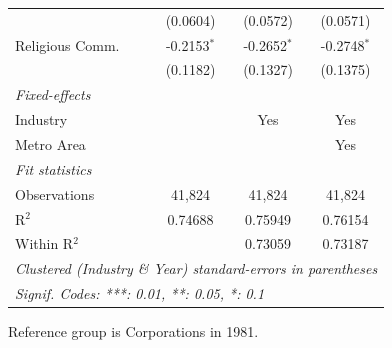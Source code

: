 \documentclass[
  12pt]{article}
\begin{document}
\begin{table}
\begin{minipage}{\linewidth}
\begin{tabular}{lccc}
                     & (0.0604)       & (0.0572)       & (0.0571)\\   
   Religious Comm.   & -0.2153$^{*}$  & -0.2652$^{*}$  & -0.2748$^{*}$\\   
                     & (0.1182)       & (0.1327)       & (0.1375)\\   
   \midrule
   \emph{Fixed-effects}\\
   Industry          &                & Yes            & Yes\\  
   Metro Area        &                &                & Yes\\  
   \midrule
   \emph{Fit statistics}\\
   Observations      & 41,824         & 41,824         & 41,824\\  
   R$^2$             & 0.74688        & 0.75949        & 0.76154\\  
   Within R$^2$      &                & 0.73059        & 0.73187\\  
   \midrule \midrule
   \multicolumn{4}{l}{\emph{Clustered (Industry \& Year) standard-errors in parentheses}}\\
   \multicolumn{4}{l}{\emph{Signif. Codes: ***: 0.01, **: 0.05, *: 0.1}}\\
\end{tabular}

\end{minipage}%
\newline
\begin{minipage}{\linewidth}

\par \raggedright

\end{minipage}%
\newline
\begin{minipage}{\linewidth}

Reference group is Corporations in 1981.

\end{minipage}%
\newline
\begin{minipage}{\linewidth}

\par\endgroup

\end{minipage}%

\end{table}%
\end{document}
